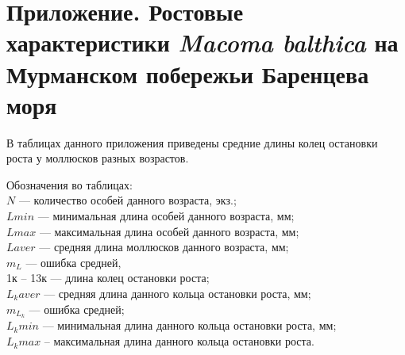 
\section{Приложение. Ростовые характеристики {\it Macoma balthica} на Мурманском побережьи Баренцева моря}
\label{app:growth_matrix}

В   таблицах данного приложения   приведены средние длины колец остановки роста у моллюсков разных возрастов.

\vspace{5em}

Обозначения во таблицах:\\[2em]
$N$ --- количество  особей  данного возраста, экз.;\\
$L min$  ---  минимальная   длина  особей   данного   возраста,   мм;\\
$L max$   ---   максимальная   длина   особей   данного   возраста,   мм;\\
$L aver$ --- средняя длина моллюсков данного возраста, мм;\\
$m_L$ --- ошибка средней,\\
1к -- 13к --- длина колец остановки роста;\\
$L_k aver$ --- средняя длина данного кольца остановки роста, мм;\\
$m_{L_k}$ --- ошибка средней;\\
$L_k min$ --- минимальная длина данного кольца остановки роста, мм; \\
$L_k   max$   --   максимальная   длина   данного   кольца   остановки   роста.   \\




